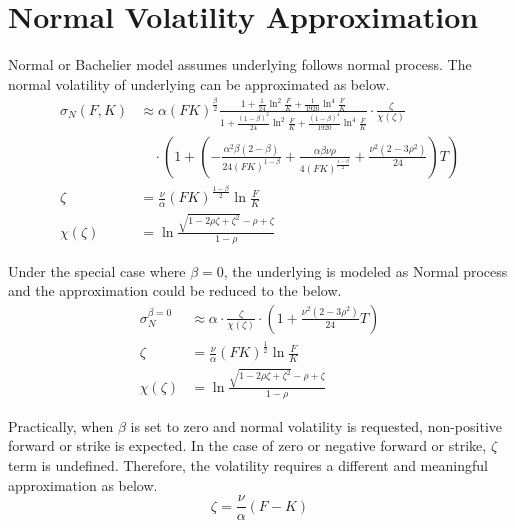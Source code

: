 \documentclass{article}
\begin{document}
\section{Normal Volatility Approximation}

Normal or Bachelier model assumes underlying follows normal process.
The normal volatility of underlying can be approximated as below.
\begin{subequations}
    \begin{align}
        \sigma_N{(F, K)} &\approx \alpha {\left(F K\right)}^{\frac{\beta}{2}} \frac{1 + \frac{1}{24} \ln^2{\frac{F}{K}} + \frac{1}{1920} \ln^4{\frac{F}{K}}}{1 + \frac{\left(1 - \beta\right)^{2}}{24} \ln^2{\frac{F}{K}} + \frac{\left(1 - \beta\right)^{4}}{1920} \ln^4{\frac{F}{K}}} \cdot \frac{\zeta}{\chi \left(\zeta\right)}\nonumber \\
        & \quad \cdot \left(1 + \left(-\frac{\alpha^2 \beta (2 - \beta)}{24 {\left(F K\right)}^{1 - \beta}} + \frac{\alpha \beta \nu \rho}{4 {\left(F K\right)}^{\frac{1 - \beta}{2}}} + \frac{\nu^2 \left(2 - 3 \rho^2\right)}{24}\right) T \right)\\
        \zeta &= \frac{\nu}{\alpha} {(F K)}^{\frac{1 - \beta}{2}} \ln{\frac{F}{K}} \\
        \chi(\zeta) &= \ln{\frac{\sqrt{1 - 2 \rho \zeta + {\zeta}^2} - \rho + \zeta}{1 - \rho}}
    \end{align}
\end{subequations}

Under the special case where $ \beta = 0 $, the underlying is modeled as Normal process and the approximation could be reduced to the below.
\begin{subequations}
    \begin{align}
        \sigma_N^{\beta=0} &\approx \alpha \cdot \frac{\zeta}{\chi(\zeta)} \cdot \left(1 + \frac{\nu^2 \left(2 - 3 \rho^2\right)}{24} T \right) \\
        \zeta &= \frac{\nu}{\alpha} (F K)^{\frac{1}{2}} \ln{\frac{F}{K}} \\
        \chi(\zeta) &= \ln{\frac{\sqrt{1 - 2 \rho \zeta + \zeta^2} - \rho + \zeta}{1 - \rho}}
    \end{align}
\end{subequations}

Practically, when $ \beta $ is set to zero and normal volatility is requested, non-positive forward or strike is expected.
In the case of zero or negative forward or strike, $ \zeta $ term is undefined.
Therefore, the volatility requires a different and meaningful approximation as below.
\begin{equation}
    \zeta = \frac{\nu}{\alpha} \left(F - K\right)
\end{equation}
\end{document}

